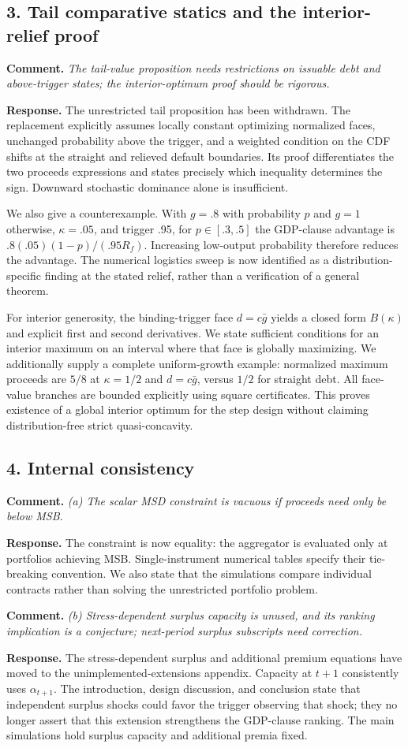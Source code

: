 \documentclass[11pt]{article}
\newcommand{\comment}[1]{\par\medskip\Needspace{7\baselineskip}\noindent\textbf{Comment.} \emph{#1}\par\smallskip}
\newcommand{\response}{\noindent\textbf{Response.} }
\begin{document}
\subsection*{3. Tail comparative statics and the interior-relief proof}
\comment{The tail-value proposition needs restrictions on issuable debt and above-trigger states; the interior-optimum proof should be rigorous.}
\response The unrestricted tail proposition has been withdrawn. The replacement explicitly assumes locally constant optimizing normalized faces, unchanged probability above the trigger, and a weighted condition on the CDF shifts at the straight and relieved default boundaries. Its proof differentiates the two proceeds expressions and states precisely which inequality determines the sign. Downward stochastic dominance alone is insufficient.

We also give a counterexample. With $g=.8$ with probability $p$ and $g=1$ otherwise, $\kappa=.05$, and trigger .95, for $p\in[.3,.5]$ the GDP-clause advantage is $.8(.05)(1-p)/(.95R_f)$. Increasing low-output probability therefore reduces the advantage. The numerical logistics sweep is now identified as a distribution-specific finding at the stated relief, rather than a verification of a general theorem.

For interior generosity, the binding-trigger face $d=c\bar g$ yields a closed form $B(\kappa)$ and explicit first and second derivatives. We state sufficient conditions for an interior maximum on an interval where that face is globally maximizing. We additionally supply a complete uniform-growth example: normalized maximum proceeds are $5/8$ at $\kappa=1/2$ and $d=c\bar g$, versus $1/2$ for straight debt. All face-value branches are bounded explicitly using square certificates. This proves existence of a global interior optimum for the step design without claiming distribution-free strict quasi-concavity.

\subsection*{4. Internal consistency}
\comment{(a) The scalar MSD constraint is vacuous if proceeds need only be below MSB.}
\response The constraint is now equality: the aggregator is evaluated only at portfolios achieving MSB. Single-instrument numerical tables specify their tie-breaking convention. We also state that the simulations compare individual contracts rather than solving the unrestricted portfolio problem.

\comment{(b) Stress-dependent surplus capacity is unused, and its ranking implication is a conjecture; next-period surplus subscripts need correction.}
\response The stress-dependent surplus and additional premium equations have moved to the unimplemented-extensions appendix. Capacity at $t+1$ consistently uses $\alpha_{t+1}$. The introduction, design discussion, and conclusion state that independent surplus shocks could favor the trigger observing that shock; they no longer assert that this extension strengthens the GDP-clause ranking. The main simulations hold surplus capacity and additional premia fixed.
\end{document}
